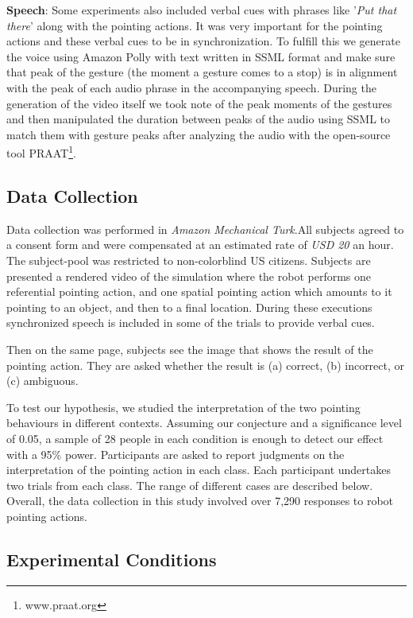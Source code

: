 

\noindent\textbf{Speech}: Some experiments also included verbal cues with phrases like '\textit{Put that there}' along with the pointing actions. It was very important for the pointing actions and these verbal cues to be in synchronization. To fulfill this we generate the voice using Amazon Polly with text written in SSML format and make sure that peak of the gesture (the moment a gesture comes to a stop) is in alignment with the peak of each audio phrase in the accompanying speech. During the generation of the video itself we took note of the peak moments of the gestures and then manipulated the duration between peaks of the audio using SSML to match them with gesture peaks after analyzing the audio with the open-source tool PRAAT\footnote{www.praat.org}.

\subsection{Data Collection}

Data collection was performed in \textit{Amazon Mechanical Turk}.All subjects agreed to a consent form and were compensated at an estimated rate of \textit{USD 20} an hour. The subject-pool was restricted to non-colorblind US citizens. Subjects are presented a rendered video of the simulation where the robot performs one referential pointing action, and one spatial pointing action which amounts to it pointing to an object, and then to a final location. During these executions synchronized speech is included in some of the trials to provide verbal cues.

Then on the same page, subjects see the image that shows the result of the pointing action. They are asked whether the result is (a) correct, (b) incorrect, or (c) ambiguous.  

To test our hypothesis, we studied the interpretation of the two pointing behaviours in different contexts. Assuming our conjecture and a significance level of 0.05, a sample of 28 people in each condition is enough to detect our effect with a 95\% power.  Participants are asked to report judgments on the interpretation of the pointing action in each class.  Each participant undertakes two trials from each class.  The range of different cases are described below.  Overall, the data collection in this study involved over 7,290 responses to robot pointing actions.

\subsection{Experimental Conditions}

